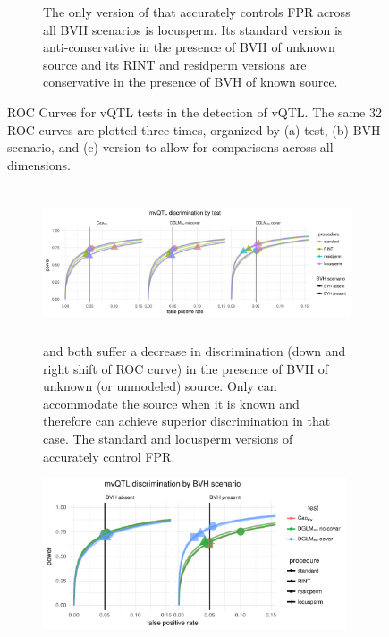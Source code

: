 \begin{figure}[ht]
\begin{subfigure}{\textwidth}
          \caption{
          The only version of \DGLMv that accurately controls FPR across all BVH scenarios is locusperm.
          Its standard version is anti-conservative in the presence of BVH of unknown source and its RINT and residperm versions are conservative in the presence of BVH of known source.
          }
      \end{subfigure}
      \caption[
        ROC Curves for vQTL tests in the detection of vQTL.
      ]
      {
        ROC Curves for vQTL tests in the detection of vQTL.
        The same 32 ROC curves are plotted three times, organized by (a) test, (b) BVH scenario, and (c) version to allow for comparisons across all dimensions.
      }
      \label{fig:vqtl_rocs_supp}
  \end{figure}


  \begin{figure}[ht]
      \begin{subfigure}{\textwidth}
          \centering
          \includegraphics[height = 4.5cm]{images/rocs_mvqtl_all_facet_by_test.pdf}
          \caption{
          \Caomv and \DGLMmv both suffer a decrease in discrimination (down and right shift of ROC curve) in the presence of BVH of unknown (or unmodeled) source.
          Only \DGLMmv can accommodate the source when it is known and therefore can achieve superior discrimination in that case.
          The standard and locusperm versions of \DGLMmv accurately control FPR.
          }
      \vspace*{0.5cm}
      \end{subfigure}
      \begin{subfigure}{\textwidth}
          \centering
          \includegraphics[height = 4.5cm]{images/rocs_mvqtl_all_facet_by_bvh.pdf}

\end{subfigure}
\end{figure}
